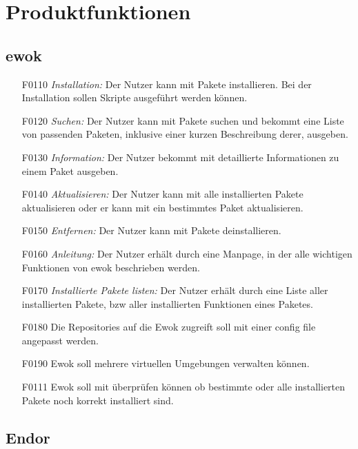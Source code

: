 \chapter{Produktfunktionen}

\section{ewok}

\begin{itemize}
	\item[F0110] \textit{Installation:} Der Nutzer kann mit  Pakete installieren. Bei der Installation sollen Skripte ausgeführt werden können.
	\item[F0120] \textit{Suchen:} Der Nutzer kann mit  Pakete suchen und bekommt eine Liste von passenden Paketen, inklusive einer kurzen Beschreibung derer, ausgeben.
	\item[F0130] \textit{Information:} Der Nutzer bekommt mit  detaillierte Informationen zu einem Paket ausgeben.
	\item[F0140] \textit{Aktualisieren:} Der Nutzer kann mit  alle installierten Pakete aktualisieren oder er kann mit  ein bestimmtes Paket aktualisieren.
	\item[F0150] \textit{Entfernen:} Der Nutzer kann mit  Pakete deinstallieren.
	\item[F0160] \textit{Anleitung:} Der Nutzer erhält durch  eine Manpage, in der alle wichtigen Funktionen von ewok beschrieben werden.
	\item[F0170] \textit{Installierte Pakete listen:} Der Nutzer erhält durch  eine Liste aller installierten Pakete, bzw aller installierten Funktionen eines Paketes.
	\item[F0180] Die Repositories auf die Ewok zugreift soll mit einer config file angepasst werden.
	\item[F0190] Ewok soll mehrere virtuellen Umgebungen verwalten können. 
	\item[F0111] Ewok soll mit 	 überprüfen können ob bestimmte oder alle installierten Pakete noch korrekt installiert sind.
\end{itemize}

\section{Endor}

